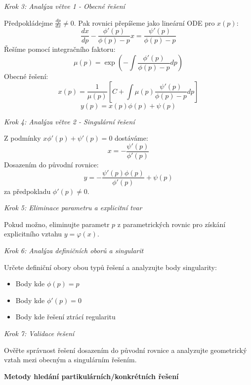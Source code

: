 \vspace{1\baselineskip}

\noindent\textit{Krok 3: Analýza větve 1 - Obecné řešení}

Předpokládejme $\frac{dp}{dx} \neq 0$. Pak rovnici přepíšeme jako lineární ODE pro $x(p)$:
\[
\frac{dx}{dp} - \frac{\phi'(p)}{\phi(p) - p}x = \frac{\psi'(p)}{\phi(p) - p}
\]
Řešíme pomocí integračního faktoru:
\[
\mu(p) = \exp\left(-\int \frac{\phi'(p)}{\phi(p) - p} dp\right)
\]
Obecné řešení:
\[
x(p) = \frac{1}{\mu(p)} \left[ C + \int \mu(p) \frac{\psi'(p)}{\phi(p) - p} dp \right]
\]
\[
y(p) = x(p)\phi(p) + \psi(p)
\]

\vspace{1\baselineskip}

\noindent\textit{Krok 4: Analýza větve 2 - Singulární řešení}

Z podmínky $x\phi'(p) + \psi'(p) = 0$ dostáváme:
\[
x = -\frac{\psi'(p)}{\phi'(p)}
\]
Dosazením do původní rovnice:
\[
y = -\frac{\psi'(p)\phi(p)}{\phi'(p)} + \psi(p)
\]
za předpokladu $\phi'(p) \neq 0$.

\vspace{1\baselineskip}

\noindent\textit{Krok 5: Eliminace parametru a explicitní tvar}

Pokud možno, eliminujte parametr $p$ z parametrických rovnic pro získání explicitního vztahu $y = \varphi(x)$.

\vspace{1\baselineskip}

\noindent\textit{Krok 6: Analýza definičních oborů a singularit}

Určete definiční obory obou typů řešení a analyzujte body singularity:
\begin{itemize}
\item Body kde $\phi(p) = p$
\item Body kde $\phi'(p) = 0$ 
\item Body kde řešení ztrácí regularitu
\end{itemize}

\vspace{1\baselineskip}

\noindent\textit{Krok 7: Validace řešení}

Ověřte správnost řešení dosazením do původní rovnice a analyzujte geometrický vztah mezi obecným a singulárním řešením.

\vspace{1\baselineskip}

\noindent\textbf{Metody hledání partikulárních/konkrétních řešení}

